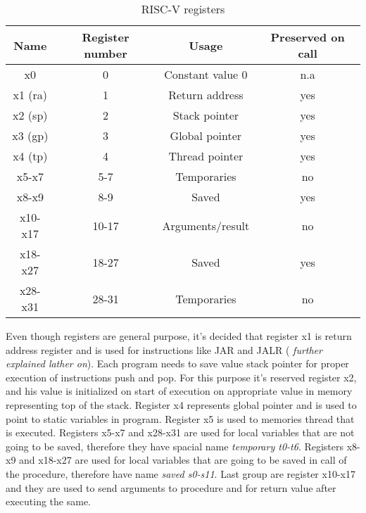 \documentclass{scrreprt}
\begin{document}
    \begin{table}[ht]
        \centering
        \begin{tabular}{|c|c|c|c|} \hline 
            Name & Register number & Usage & Preserved on call\\ \hline 
            x0 & 0 & Constant value 0 & n.a\\ \hline 
            x1 (ra) & 1 & Return address & yes\\ \hline 
            x2 (sp) & 2 & Stack pointer & yes\\ \hline 
            x3 (gp) & 3 & Global pointer & yes\\ \hline 
            x4 (tp) & 4 & Thread pointer & yes\\ \hline 
            x5-x7 & 5-7 & Temporaries & no \\ \hline 
            x8-x9 & 8-9 & Saved & yes\\ \hline 
            x10-x17 & 10-17 & Arguments/result & no\\ \hline 
            x18-x27 & 18-27 & Saved & yes\\ \hline 
            x28-x31 & 28-31 & Temporaries & no\\ \hline
        \end{tabular}
        \caption{RISC-V registers}
        \label{tab:table3}
    \end{table}

    Even though registers are general purpose, it's decided that register x1 is return address register and is used for instructions like JAR and JALR ( \textit{further explained lather on}). Each program needs to save value stack pointer for proper execution of instructions push and pop. For this purpose it's reserved register x2, and his value is initialized on start of execution on appropriate value in memory representing top of the stack. Register x4 represents global pointer and is used to point to static variables in program. Register x5 is used to memories thread that is executed. Registers x5-x7 and x28-x31 are used for local variables that are not going to be saved, therefore they have spacial name \textit{temporary t0-t6}. Registers x8-x9 and x18-x27 are used for local variables that are going to be saved in call of the procedure, therefore have name \textit{saved s0-s11}. Last group are register x10-x17 and they are used to send arguments to procedure and for return value after executing the same.  

\end{document}
